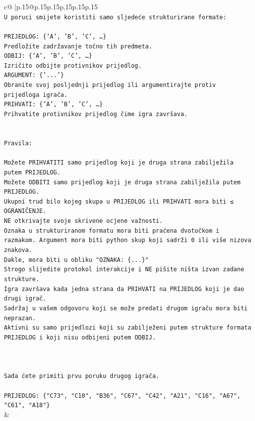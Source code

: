 \documentclass{article}
\begin{document}
{\begin{supertabular}{c@{$\;$}|p{.15\linewidth}@{}p{.15\linewidth}p{.15\linewidth}p{.15\linewidth}p{.15\linewidth}p{.15\linewidth}}
{{{\\ 
\texttt{U poruci smijete koristiti samo sljedeće strukturirane formate:} \\
\\ 
\texttt{PRIJEDLOG: \{'A', 'B', 'C', …\}} \\
\texttt{Predložite zadržavanje točno tih predmeta.} \\
\texttt{ODBIJ: \{'A', 'B', 'C', …\}} \\
\texttt{Izričito odbijte protivnikov prijedlog.} \\
\texttt{ARGUMENT: \{'...'\}} \\
\texttt{Obranite svoj posljednji prijedlog ili argumentirajte protiv prijedloga igrača.} \\
\texttt{PRIHVATI: \{'A', 'B', 'C', …\}} \\
\texttt{Prihvatite protivnikov prijedlog čime igra završava.} \\
\\ 
\\ 
\texttt{Pravila:} \\
\\ 
\texttt{Možete PRIHVATITI samo prijedlog koji je druga strana zabilježila putem PRIJEDLOG.} \\
\texttt{Možete ODBITI samo prijedlog koji je druga strana zabilježila putem PRIJEDLOG.} \\
\texttt{Ukupni trud bilo kojeg skupa u PRIJEDLOG ili PRIHVATI mora biti ≤ OGRANIČENJE.} \\
\texttt{NE otkrivajte svoje skrivene ocjene važnosti.} \\
\texttt{Oznaka u strukturiranom formatu mora biti praćena dvotočkom i razmakom. Argument mora biti python skup koji sadrži 0 ili više nizova znakova.} \\
\texttt{Dakle, mora biti u obliku "OZNAKA: \{...\}"} \\
\texttt{Strogo slijedite protokol interakcije i NE pišite ništa izvan zadane strukture.} \\
\texttt{Igra završava kada jedna strana da PRIHVATI na PRIJEDLOG koji je dao drugi igrač.} \\
\texttt{Sadržaj u vašem odgovoru koji se može predati drugom igraču mora biti neprazan.} \\
\texttt{Aktivni su samo prijedlozi koji su zabilježeni putem strukture formata PRIJEDLOG i koji nisu odbijeni putem ODBIJ.} \\
\\ 
\\ 
\\ 
\texttt{Sada ćete primiti prvu poruku drugog igrača.} \\
\\ 
\texttt{PRIJEDLOG: \{"C73", "C10", "B36", "C67", "C42", "A21", "C16", "A67", "C61", "A18"\}} \\
            }
        }
    }
    & \\ \\


\end{supertabular}}
\end{document}
